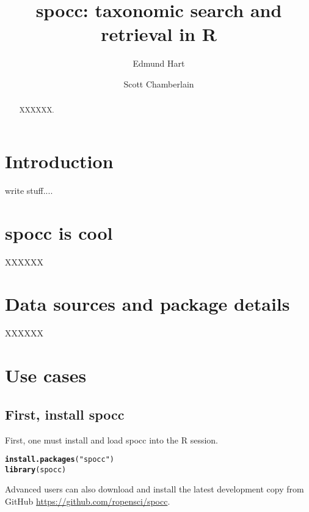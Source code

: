\documentclass[10pt,a4paper,twocolumn]{article}\usepackage[]{graphicx}\usepackage[]{color}
\makeatletter
\newcommand{\hlstr}[1]{\textcolor[rgb]{0.192,0.494,0.8}{#1}}%
\newcommand{\hlstd}[1]{\textcolor[rgb]{0.345,0.345,0.345}{#1}}%
\newcommand{\hlkwd}[1]{\textcolor[rgb]{0.737,0.353,0.396}{\textbf{#1}}}%
\newenvironment{kframe}{%
 \def\at@end@of@kframe{}%
 \ifinner\ifhmode%
  \def\at@end@of@kframe{\end{minipage}}%
  \begin{minipage}{\columnwidth}%
 \fi\fi%
 \def\FrameCommand##1{\hskip\@totalleftmargin \hskip-\fboxsep
 \colorbox{shadecolor}{##1}\hskip-\fboxsep
     \hskip-\linewidth \hskip-\@totalleftmargin \hskip\columnwidth}%
 \MakeFramed {\advance\hsize-\width
   \@totalleftmargin\z@ \linewidth\hsize
   \@setminipage}}%
 {\par\unskip\endMakeFramed%
 \at@end@of@kframe}
\newenvironment{knitrout}{}{} %
\makeatother
\begin{document}
\title{spocc: taxonomic search and retrieval in R}
\author[1]{Edmund Hart}
\author[2]{Scott Chamberlain}

\maketitle
\thispagestyle{fancy}

\begin{abstract}
XXXXXX.
\end{abstract}
\clearpage

\section*{Introduction}
write stuff....

\section*{spocc is cool}
XXXXXX

\section*{Data sources and package details}
XXXXXX

\section*{Use cases}

\subsection*{First, install spocc}

First, one must install and load spocc into the R session.

\begin{knitrout}\scriptsize
{}\color{fgcolor}\begin{kframe}
\begin{alltt}
\hlkwd{install.packages}\hlstd{(}\hlstr{"spocc"}\hlstd{)}
\hlkwd{library}\hlstd{(spocc)}
\end{alltt}
\end{kframe}
\end{knitrout}





Advanced users can also download and install the latest development copy from GitHub \url{https://github.com/ropensci/spocc}.
\end{document}
